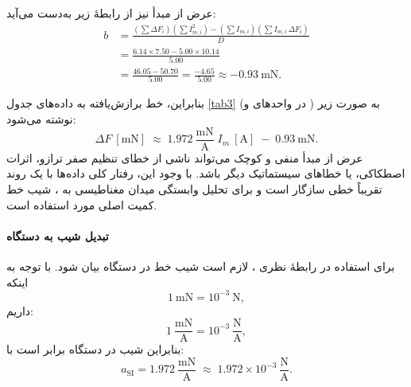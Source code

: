 \documentclass[a4paper, 11pt]{article}
\begin{document}
عرض از مبدأ  نیز از رابطهٔ زیر به‌دست می‌آید:
\begin{align}
b &= \frac{\left(\sum \Delta F_i\right)\left(\sum I_{m,i}^2\right) - \left(\sum I_{m,i}\right)\left(\sum I_{m,i}\,\Delta F_i\right)}
         {D} \nonumber\\
  &= \frac{6.14\times 7.50 - 5.00\times 10.14}{5.00} \nonumber\\
  &= \frac{46.05 - 50.70}{5.00} 
   = \frac{-4.65}{5.00} 
   \approx -0.93~\mathrm{mN}.
\end{align}

بنابراین، خط برازش‌یافته به داده‌های جدول \ref{tab3} (در واحدهای  و ) به صورت زیر نوشته می‌شود:
\begin{equation}
\Delta F~[\mathrm{mN}] \;\approx\; 1.972~\frac{\mathrm{mN}}{\mathrm{A}}\; I_m~[\mathrm{A}] \;-\; 0.93~\mathrm{mN}.
\end{equation}
عرض از مبدأ منفی و کوچک می‌تواند ناشی از خطای تنظیم صفر ترازو، اثرات اصطکاکی، یا خطاهای سیستماتیک دیگر باشد. با وجود این، رفتار کلی داده‌ها با یک روند تقریباً خطی سازگار است و برای تحلیل وابستگی میدان مغناطیسی به ، شیب خط کمیت اصلی مورد استفاده است.

\paragraph{تبدیل شیب به دستگاه }
برای استفاده در رابطهٔ نظری ، لازم است شیب خط در دستگاه  بیان شود. با توجه به اینکه
\[
1~\mathrm{mN} = 10^{-3}~\mathrm{N},
\]
داریم:
\begin{equation}
1~\frac{\mathrm{mN}}{\mathrm{A}} = 10^{-3}~\frac{\mathrm{N}}{\mathrm{A}},
\end{equation}
بنابراین شیب در دستگاه  برابر است با:
\begin{equation}
a_{\mathrm{SI}} = 1.972~\frac{\mathrm{mN}}{\mathrm{A}}
\;\approx\; 1.972\times 10^{-3}~\frac{\mathrm{N}}{\mathrm{A}}.
\end{equation}
\end{document}
